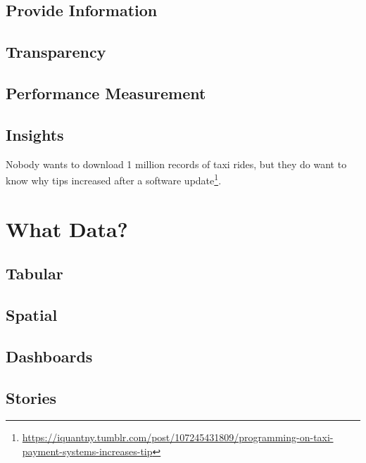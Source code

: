 \documentclass[
]{book}
\begin{document}
\hypertarget{provide-information}{%
\section{Provide Information}\label{provide-information}}

\hypertarget{transparency}{%
\section{Transparency}\label{transparency}}

\hypertarget{performance-measurement}{%
\section{Performance Measurement}\label{performance-measurement}}

\hypertarget{insights}{%
\section{Insights}\label{insights}}

Nobody wants to download 1 million records of taxi rides, but they do want to know why tips increased after a software update\footnote{\url{https://iquantny.tumblr.com/post/107245431809/programming-on-taxi-payment-systems-increases-tip}}.

\hypertarget{what-data}{%
\chapter{What Data?}\label{what-data}}

\hypertarget{tabular}{%
\section{Tabular}\label{tabular}}

\hypertarget{spatial}{%
\section{Spatial}\label{spatial}}

\hypertarget{dashboards}{%
\section{Dashboards}\label{dashboards}}

\hypertarget{stories}{%
\section{Stories}\label{stories}}
\end{document}
